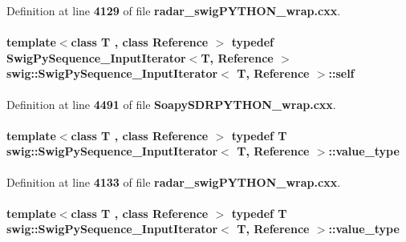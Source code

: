 Definition at line {\bf 4129} of file {\bf radar\+\_\+swig\+P\+Y\+T\+H\+O\+N\+\_\+wrap.\+cxx}.

\paragraph[{self}]{\setlength{\rightskip}{0pt plus 5cm}template$<$class T , class Reference $>$ typedef {\bf Swig\+Py\+Sequence\+\_\+\+Input\+Iterator}$<$T, Reference $>$ {\bf swig\+::\+Swig\+Py\+Sequence\+\_\+\+Input\+Iterator}$<$ T, Reference $>$\+::{\bf self}}\label{structswig_1_1SwigPySequence__InputIterator_a3d3f028d1d9af412c61de2b5d8630321}


Definition at line {\bf 4491} of file {\bf Soapy\+S\+D\+R\+P\+Y\+T\+H\+O\+N\+\_\+wrap.\+cxx}.

\paragraph[{value\+\_\+type}]{\setlength{\rightskip}{0pt plus 5cm}template$<$class T , class Reference $>$ typedef T {\bf swig\+::\+Swig\+Py\+Sequence\+\_\+\+Input\+Iterator}$<$ T, Reference $>$\+::{\bf value\+\_\+type}}\label{structswig_1_1SwigPySequence__InputIterator_ad7b3ca8f977dda776f80b7c2099cae2f}


Definition at line {\bf 4133} of file {\bf radar\+\_\+swig\+P\+Y\+T\+H\+O\+N\+\_\+wrap.\+cxx}.

\paragraph[{value\+\_\+type}]{\setlength{\rightskip}{0pt plus 5cm}template$<$class T , class Reference $>$ typedef T {\bf swig\+::\+Swig\+Py\+Sequence\+\_\+\+Input\+Iterator}$<$ T, Reference $>$\+::{\bf value\+\_\+type}}\label{structswig_1_1SwigPySequence__InputIterator_ad7b3ca8f977dda776f80b7c2099cae2f}


